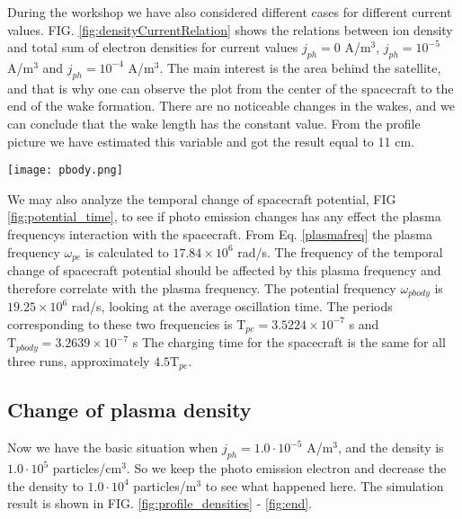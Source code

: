 \documentclass[aip, 
rsi, 
amsmath,
amssymb,
longbibliography,
preprint]{revtex4-1}
\begin{document}
During the workshop we have also considered different cases for different current values. FIG. \ref{fig:densityCurrentRelation} shows the relations between ion density and total sum of electron densities for current values $j_{ph}=0$ A/m$^3$, $j_{ph}=10^{-5}$ A/m$^3$ and $j_{ph}=10^{-4}$ A/m$^3$. The main interest is the area behind the satellite, and that is why one can observe the plot from the center of the spacecraft to the end of the wake formation. There are no noticeable changes in the wakes, and we can conclude that the wake length has the constant value. From the profile picture we have estimated this variable and got the result equal to 11 cm.

\begin{figure*}
\texttt{[image: pbody.png]}
\caption{The change in the spacecraft potential over time. Data from one simulation with no photo emission, and two simulations with photo-emission from the wake side on the body. $j_{ph}$ is the photo-emission density in A/m$^3$. \label{fig:potential_time}}
\end{figure*}

We may also analyze the temporal change of spacecraft potential, FIG \ref{fig:potential_time}, to see if photo emission changes has any effect the plasma frequencys interaction with the spacecraft.  From Eq. \ref{plasmafreq} the plasma frequency $\omega_{pe}$ is calculated to $17.84 \times 10^6$ rad/s. The frequency of the temporal change of spacecraft potential should be affected by this plasma frequency and therefore correlate with the plasma frequency. The potential frequency $\omega_{pbody}$ is $19.25 \times 10^6$ rad/s, looking at the average oscillation time. The periods corresponding to these two frequencies is $\mathrm{T}_{pe} = 3.5224 \times 10^{-7}$ s and $\mathrm{T}_{pbody} = 3.2639 \times 10^{-7}$ s The charging time for the spacecraft is the same for all three runs, approximately $4.5\mathrm{T}_{pe}$.

\subsection{Change of plasma density}

Now we have the basic situation when $j_{ph}= 1.0\cdot10^{-5}$ A/m$^3$, and the density is $1.0\cdot10^5$ particles/cm$^3$. So we keep the photo emission electron and decrease the the density to $1.0\cdot10^4$ particles/m$^3$ to see what happened here. The simulation result is shown in FIG. \ref{fig:profile_densities} - \ref{fig:end}.
\end{document}
